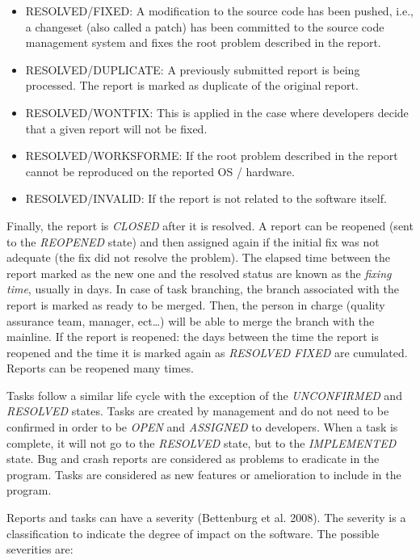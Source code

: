 \documentclass[natbib]{svjour3}
\providecommand{\tightlist}{%
  \setlength{\itemsep}{0pt}\setlength{\parskip}{0pt}}
\begin{document}
\begin{itemize}
\tightlist
\item
  RESOLVED/FIXED: A modification to the source code has been pushed,
  i.e., a changeset (also called a patch) has been committed to the
  source code management system and fixes the root problem described in
  the report.
\item
  RESOLVED/DUPLICATE: A previously submitted report is being processed.
  The report is marked as duplicate of the original report.
\item
  RESOLVED/WONTFIX: This is applied in the case where developers decide
  that a given report will not be fixed.
\item
  RESOLVED/WORKSFORME: If the root problem described in the report
  cannot be reproduced on the reported OS / hardware.
\item
  RESOLVED/INVALID: If the report is not related to the software itself.
\end{itemize}

Finally, the report is \emph{CLOSED} after it is resolved. A report can
be reopened (sent to the \emph{REOPENED} state) and then assigned again
if the initial fix was not adequate (the fix did not resolve the
problem). The elapsed time between the report marked as the new one and
the resolved status are known as the \emph{fixing time}, usually in
days. In case of task branching, the branch associated with the report
is marked as ready to be merged. Then, the person in charge (quality
assurance team, manager, ect\ldots{}) will be able to merge the branch
with the mainline. If the report is reopened: the days between the time
the report is reopened and the time it is marked again as \emph{RESOLVED
FIXED} are cumulated. Reports can be reopened many times.

Tasks follow a similar life cycle with the exception of the
\emph{UNCONFIRMED} and \emph{RESOLVED} states. Tasks are created by
management and do not need to be confirmed in order to be \emph{OPEN}
and \emph{ASSIGNED} to developers. When a task is complete, it will not
go to the \emph{RESOLVED} state, but to the \emph{IMPLEMENTED} state.
Bug and crash reports are considered as problems to eradicate in the
program. Tasks are considered as new features or amelioration to include
in the program.

Reports and tasks can have a severity (Bettenburg et al. 2008). The
severity is a classification to indicate the degree of impact on the
software. The possible severities are:
\end{document}
